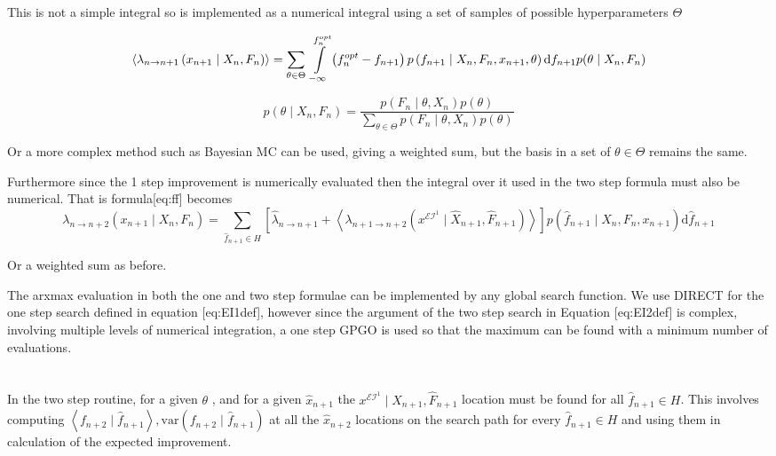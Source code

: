 \documentclass[11pt]{article}
\begin{document}
This is not a simple integral so is implemented as a numerical integral using a set of samples of possible hyperparameters $\Theta$
 
\begin{equation}
\left\langle \lambda_{n\rightarrow n+1}\left(x_{n+1}\mid X_{n},F_{n}\right)\right\rangle =\sum_{\theta\in\Theta}\:\intop_{-\infty}^{f_{n}^{opt}}\left(f_{n}^{opt}-f_{n+1}\right)p\left(f_{n+1}\mid X_{n},F_{n},x_{n+1},\theta\right)\mathrm{d}f_{n+1}p(\theta\mid X_{n},F_{n})
\end{equation}
 
\begin{equation}
p(\theta\mid X_{n},F_{n})=\frac{p(F_{n}\mid\theta,X_{n})p\left(\theta\right)}{\sum_{\theta\in\Theta}p(F_{n}\mid\theta,X_{n})p\left(\theta\right)}
\end{equation}

Or a more complex method such as Bayesian MC can be used, giving a weighted sum, but the basis in a set of $\theta \in \Theta$  remains the same.

Furthermore since the 1 step improvement is numerically evaluated then the integral over it used in the two step formula must also be numerical. That is formula[eq:ff] becomes
\begin{equation}
\lambda_{n\rightarrow n+2}\left(x_{n+1}\mid X_{n},F_{n}\right)=\sum_{\widehat{f}_{n+1}\in H}\left[\widehat{\lambda}_{n\rightarrow n+1}+\left\langle \lambda_{n+1\rightarrow n+2}\left(x^{\mathcal{EI}^{1}}\mid\widehat{X}_{n+1},\widehat{F}_{n+1}\right)\right\rangle \right]p\left(\widehat{f}_{n+1}\mid X_{n},F_{n},x_{n+1}\right)\mathrm{d}\widehat{f}_{n+1}
\end{equation}
 

Or a weighted sum as before.

The arxmax evaluation in both the one and two step formulae can be implemented by any global search function. We use DIRECT for the one step search defined in equation [eq:EI1def], however since the argument of the two step search in Equation [eq:EI2def] is complex, involving multiple levels of numerical integration, a one step GPGO is used so that the maximum can be found with a minimum number of evaluations.

\section{}
In the two step routine, for a given $\theta$ , and for a given $\widehat{x}_{n+1}$
 the $x^{\mathcal{EI}^{1}}\mid\widehat{X}_{n+1},\widehat{F}_{n+1}$  location must be found for all $\widehat{f}_{n+1}\in H$.
This involves computing $\left\langle f_{n+2}\mid\widehat{f}_{n+1}\right\rangle ,\mathrm{var}\left(f_{n+2}\mid\widehat{f}_{n+1}\right)$  at all the $\widehat{x}_{n+2}$
  locations on the search path for every $\widehat{f}_{n+1}\in H$
  and using them in calculation of the expected improvement. 
\end{document}
